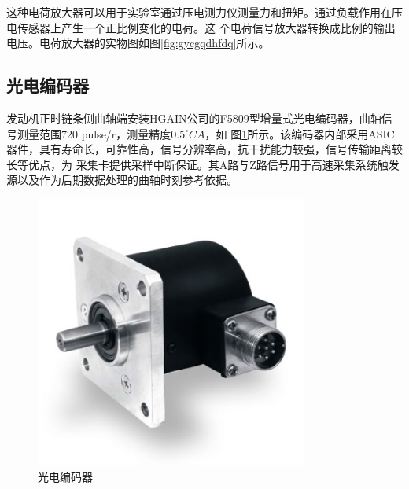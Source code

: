 这种电荷放大器可以用于实验室通过压电测力仪测量力和扭矩。通过负载作用在压电传感器上产生一个正比例变化的电荷。这
个电荷信号放大器转换成比例的输出电压。电荷放大器的实物图如图\ref{fig:gycgqdhfdq}所示。
\subsection{光电编码器}
发动机正时链条侧曲轴端安装HGAIN公司的F5809型增量式光电编码器，曲轴信号测量范围720 pulse/r，测量精度$0.5^{\circ}CA$，如
图\ref{fig:gdbmq}所示。该编码器内部采用ASIC器件，具有寿命长，可靠性高，信号分辨率高，抗干扰能力较强，信号传输距离较长等优点，为
采集卡提供采样中断保证。其A路与Z路信号用于高速采集系统触发源以及作为后期数据处理的曲轴时刻参考依据。
\begin{figure}[ht]
	\begin{minipage}[H]{0.5\linewidth}
		\centering
		\includegraphics[width=0.8\textwidth]{thesis_figure/platformer_chapter/gdbmq}
		\caption{光电编码器}
		\label{fig:gdbmq}
	\end{minipage}
	\begin{minipage}[H]{0.5\linewidth}
		\centering

\end{minipage}
\end{figure}

